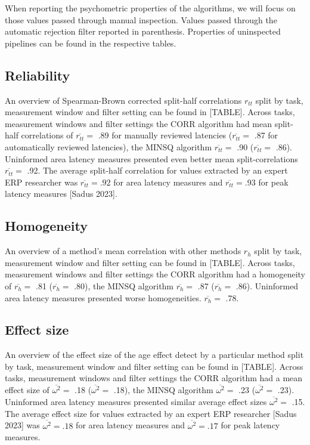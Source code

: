 \documentclass[
  man,floatsintext]{apa7}
\begin{document}
When reporting the psychometric properties of the algorithms, we will focus on those values passed through manual inspection. Values passed through the automatic rejection filter reported in parenthesis. Properties of uninspected pipelines can be found in the respective tables.

\hypertarget{reliability-1}{%
\subsection{Reliability}\label{reliability-1}}

An overview of Spearman-Brown corrected split-half correlations \(r_{tt}\) split by task, measurement window and filter setting can be found in {[}TABLE{]}. Across tasks, measurement windows and filter settings the CORR algorithm had mean split-half correlations of \(\overline{r_{tt}} =\) .89 for manually reviewed latencies (\(\overline{r_{tt}} =\) .87 for automatically reviewed latencies), the MINSQ algorithm \(\overline{r_{tt}} =\) .90 (\(\overline{r_{tt}} =\) .86). Uninformed area latency measures presented even better mean split-correlations \(\overline{r_{tt}} =\) .92. The average split-half correlation for values extracted by an expert ERP researcher was \(\overline{r_{tt}} = .92\) for area latency measures and \(\overline{r_{tt}} = .93\) for peak latency measures {[}Sadus 2023{]}.

\hypertarget{homogeneity-1}{%
\subsection{Homogeneity}\label{homogeneity-1}}

An overview of a method's mean correlation with other methods \(r_h\) split by task, measurement window and filter setting can be found in {[}TABLE{]}. Across tasks, measurement windows and filter settings the CORR algorithm had a homogeneity of \(\overline{r_{h}} =\) .81 (\(\overline{r_{h}} =\) .80), the MINSQ algorithm \(\overline{r_{h}} =\) .87 (\(\overline{r_{h}} =\) .86). Uninformed area latency measures presented worse homogeneities. \(\overline{r_{h}} =\) .78.

\hypertarget{effect-size-1}{%
\subsection{Effect size}\label{effect-size-1}}

An overview of the effect size of the age effect detect by a particular method split by task, measurement window and filter setting can be found in {[}TABLE{]}. Across tasks, measurement windows and filter settings the CORR algorithm had a mean effect size of \(\overline{\omega^2} =\) .18 (\(\overline{\omega^2} =\) .18), the MINSQ algorithm \(\overline{\omega^2} =\) .23 (\(\overline{\omega^2} =\) .23). Uninformed area latency measures presented similar average effect sizes \(\overline{\omega^2} =\) .15. The average effect size for values extracted by an expert ERP researcher {[}Sadus 2023{]} was \(\overline{\omega^2} = .18\) for area latency measures and \(\overline{\omega^2} = .17\) for peak latency measures.
\end{document}
